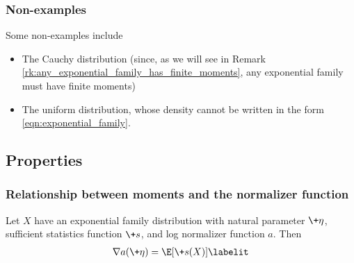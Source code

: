 \documentclass{article} %
\newcommand{\obsCaps}{X}
\newcommand{\logNormalizerFunction}{a}
\newcommand{\sufficientStatsFunction}{\+s}
\newcommand{\naturalParam}{\+\eta}
\begin{document}
\subsubsection{Non-examples}

Some non-examples include 
\begin{itemize}
\item The Cauchy distribution (since, as we will see in Remark \ref{rk:any_exponential_family_has_finite_moments}, any exponential family must have finite moments)
\item The uniform distribution, whose density cannot be written in the form \eqref{eqn:exponential_family}. %
\end{itemize}


\subsection{Properties}

\subsubsection{Relationship between moments and the normalizer function} \label{sec:relationship_between_moments_and_normalizer}

\begin{proposition}
Let $X$ have an exponential family distribution with natural parameter $\naturalParam$, sufficient statistics function $\sufficientStatsFunction$, and log normalizer function $\logNormalizerFunction$.   Then  
\begin{align*}
\nabla \logNormalizerFunction(\naturalParam) = \E[\sufficientStatsFunction(\obsCaps)] 
\labelit \label{eqn:expected_sufficient_statistic_as_derivative_of_log_normalizer}	
\end{align*}
\label{prop:expected_sufficient_statistic_as_derivative_of_log_normalizer}
\end{proposition}
\end{document}
